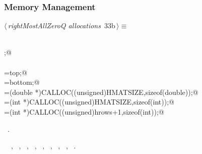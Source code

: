 \documentclass{article}
\begin{document}
\subsubsection{Memory Management}
\begin{flushleft} \small
\begin{minipage}{\linewidth}\label{scrap39}\raggedright\small
{} $\langle\,${\itshape rightMostAllZeroQ allocations}\nobreak\ {\footnotesize {33b}}$\,\rangle\equiv$
\vspace{-1ex}
\begin{list}{}{} \item
\mbox{}\verb@@\\
\mbox{};@\\
\mbox{}\verb@@\\
\mbox{}\verb@topRow=top;@\\
\mbox{}\verb@bottomRow=bottom;@\\
\mbox{}\verb@ao=(double *)CALLOC((unsigned)HMATSIZE,sizeof(double));@\\
\mbox{}\verb@aoj=(int *)CALLOC((unsigned)HMATSIZE,sizeof(int));@\\
\mbox{}\verb@aoi=(int *)CALLOC((unsigned)hrows+1,sizeof(int));@\\
\mbox{}\verb@@{\NWsep}
\end{list}
\vspace{-1.5ex}
\footnotesize
\begin{list}{}{\setlength{\itemsep}{-\parsep}\setlength{\itemindent}{-\leftmargin}}
\item \NWtxtMacroRefIn\ .
\item \NWtxtIdentsUsed\nobreak\  \verb@ao@\nobreak\ , \verb@aoi@\nobreak\ , \verb@aoj@\nobreak\ , \verb@aZero@\nobreak\ , \verb@bottom@\nobreak\ , \verb@bottomRow@\nobreak\ , \verb@hrows@\nobreak\ , \verb@top@\nobreak\ , \verb@topRow@\nobreak\ .
\item{}
\end{list}
\end{minipage}\vspace{4ex}
\end{flushleft}
\end{document}
